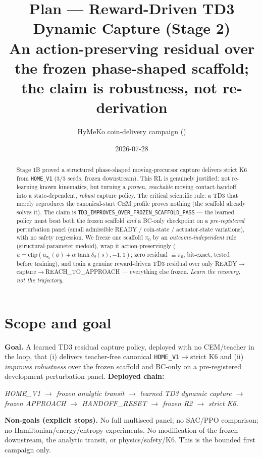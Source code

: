 \documentclass[11pt]{article}
\title{\textbf{Plan --- Reward-Driven TD3 Dynamic Capture (Stage 2)}\\[2pt]
\large An action-preserving residual over the frozen phase-shaped scaffold; the claim is robustness, not re-derivation}
\author{HyMeKo coin-delivery campaign \quad(\code{recovery/coin-r9-causal-residual-delivery})}
\date{2026-07-28}
\newcommand{\code}[1]{\texttt{\small #1}}
\begin{document}
\maketitle

\begin{abstract}
\noindent Stage 1B proved a structured phase-shaped moving-precursor capture delivers strict K6 from \code{HOME\_V1}
(3/3 seeds, frozen downstream). This RL is genuinely justified: not re-learning known kinematics, but turning a
\emph{proven, reachable} moving contact-handoff into a state-dependent, \emph{robust} capture policy. The critical
scientific rule: a TD3 that merely reproduces the canonical-start CEM profile proves nothing (the scaffold already
solves it). The claim is \code{TD3\_IMPROVES\_OVER\_FROZEN\_SCAFFOLD\_PASS} --- the learned policy must beat both the
frozen scaffold \emph{and} a BC-only checkpoint on a \emph{pre-registered} perturbation panel (small admissible READY /
coin-state / actuator-state variations), with no safety regression. We freeze one scaffold \code{$\pi_0$} by an
\emph{outcome-independent} rule (structural-parameter medoid), wrap it action-preservingly ($u=\mathrm{clip}(u_{\pi_0}(\phi)
+\alpha\tanh\delta_\theta(s),-1,1)$; zero residual $\equiv\pi_0$, bit-exact, tested before training), and train a genuine
reward-driven TD3 residual over only READY$\to$capture$\to$REACH\_TO\_APPROACH --- everything else frozen. \emph{Learn the
recovery, not the trajectory.}
\end{abstract}

\section{Scope and goal}
\textbf{Goal.} A learned TD3 residual capture policy, deployed with no CEM/teacher in the loop, that (i) delivers
teacher-free canonical \code{HOME\_V1}$\to$strict K6 and (ii) \emph{improves robustness} over the frozen scaffold and
BC-only on a pre-registered development perturbation panel. \textbf{Deployed chain:}
\begin{center}\itshape HOME\_V1 $\to$ frozen analytic transit $\to$ learned TD3 dynamic capture $\to$ frozen APPROACH
$\to$ HANDOFF\_RESET $\to$ frozen R2 $\to$ strict K6.\end{center}
\textbf{Non-goals (explicit stops).} No full multiseed panel; no SAC/PPO comparison; no Hamiltonian/energy/entropy
experiments. No modification of the frozen downstream, the analytic transit, or physics/safety/K6. This is the bounded
first campaign only.
\end{document}
